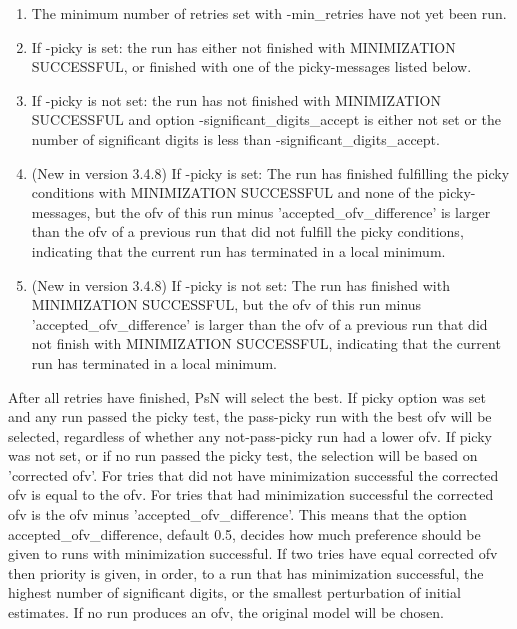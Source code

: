 \begin{enumerate}
\item The minimum number of retries set with -min\_retries have not yet been run.
\item If -picky is set: the run has either not finished with MINIMIZATION SUCCESSFUL, or finished with one of the picky-messages listed below.
\item If -picky is not set: the run has not finished with MINIMIZATION SUCCESSFUL and option -significant\_digits\_accept is either not set or the number of significant digits is less than -significant\_digits\_accept.
\item (New in version 3.4.8) If -picky is set: The run has finished fulfilling the picky conditions with MINIMIZATION SUCCESSFUL and none of the picky-messages, but the ofv of this run minus 'accepted\_ofv\_difference' is larger than the ofv of a previous run that did not fulfill the picky conditions, indicating that the current run has terminated in a local minimum.
\item (New in version 3.4.8) If -picky is not set: The run has finished with MINIMIZATION SUCCESSFUL, but the ofv of this run minus 'accepted\_ofv\_difference' is larger than the ofv of a previous run that did not finish with MINIMIZATION SUCCESSFUL, indicating that the current run has terminated in a local minimum.
\end{enumerate}

After all retries have finished, PsN will select the best. If picky option was set and any run passed the picky test, the pass-picky run with the best ofv will be selected, regardless of whether any not-pass-picky run had a lower ofv. If picky was not set, or if no run passed the picky test, the selection will be based on 'corrected ofv'. For tries that did not have minimization successful the corrected ofv is equal to the ofv. For tries that had minimization successful the corrected ofv is the ofv minus 'accepted\_ofv\_difference'. This means that the option accepted\_ofv\_difference, default 0.5, decides how much preference should be given to runs with minimization successful. If two tries have equal corrected ofv then priority is given, in order, to a run that has minimization successful, the highest number of significant digits, or the smallest perturbation of initial estimates. If no run produces an ofv, the original model will be chosen.

